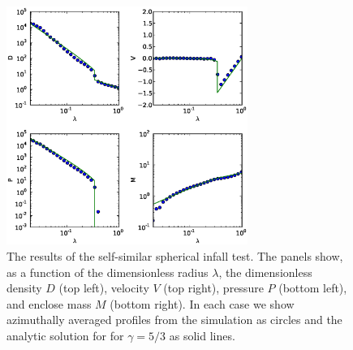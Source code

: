 \begin{figure}
\begin{center}
\includegraphics[width=0.7\textwidth]{figures/SphericalInfall.eps}
\caption{The results of the self-similar spherical infall test.  The panels show, as a function of the dimensionless radius $\lambda$, the dimensionless density $D$ (top left), velocity $V$ (top right), pressure $P$ (bottom left), and enclose mass $M$ (bottom right).  In each case we show azimuthally averaged profiles from the simulation as circles and the analytic solution for for $\gamma = 5/3$ as solid lines.}
\label{fig.sphericalinfall}
\end{center}
\end{figure}